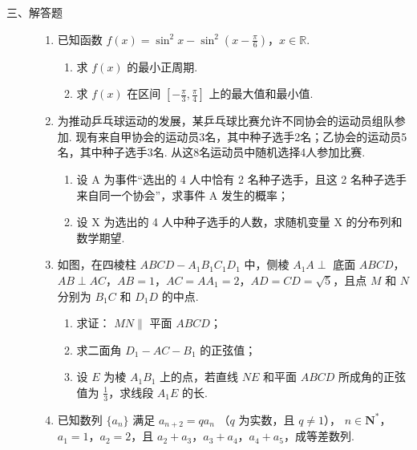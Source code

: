 \begin{description}

    \item[三、解答题]

    \begin{enumerate}[leftmargin=5pt]

      \addtocounter{enumi}{+14}

        \item 已知函数 \(f(x) = \sin^2 x - \sin^2 \left( x - \frac{\pi}{6} \right)\)，\(x \in \mathbb{R}\).

\begin{enumerate}
\item 求 \( f(x) \) 的最小正周期.
\item 求 \( f(x) \) 在区间 \( \left[-\frac{\pi}{3}, \frac{\pi}{4}\right] \) 上的最大值和最小值.
\end{enumerate}

        \item 为推动乒乓球运动的发展，某乒乓球比赛允许不同协会的运动员组队参加. 现有来自甲协会的运动员3名，其中种子选手2名；乙协会的运动员5名，其中种子选手3名. 从这8名运动员中随机选择4人参加比赛.

\begin{enumerate}
\item 设 A 为事件“选出的 4 人中恰有 2 名种子选手，且这 2 名种子选手来自同一个协会”，求事件 A 发生的概率；
\item 设 X 为选出的 4 人中种子选手的人数，求随机变量 X 的分布列和数学期望.
\end{enumerate}

        \item 如图，在四棱柱 \(ABCD - A_{1}B_{1}C_{1}D_{1}\) 中，侧棱 \(A_{1}A \perp\) 底面 \(ABCD\)，\(AB \perp AC\)，\(AB = 1\)，\(AC = AA_{1} = 2\)，\(AD = CD = \sqrt{5}\)，且点 \(M\) 和 \(N\) 分别为 \(B_{1}C\) 和 \(D_{1}D\) 的中点.

\begin{enumerate}
\item 求证： \(MN \parallel\) 平面 \(ABCD\)；
\item 求二面角 \(D_{1} - AC - B_{1}\) 的正弦值；
\item 设 \(E\) 为棱 \(A_{1}B_{1}\) 上的点，若直线 \(NE\) 和平面 \(ABCD\) 所成角的正弦值为 \(\frac{1}{3}\)，求线段 \(A_{1}E\) 的长.
\end{enumerate}

        \item 已知数列 \(\{a_{n}\}\) 满足 \(a_{n + 2} = qa_{n}\) （\(q\) 为实数，且 \(q \neq 1\)）， \(n \in \mathbf{N}^{*}\)，\(a_{1} = 1\)，\(a_{2} = 2\)，且 \(a_{2} + a_{3}\)，\(a_{3} + a_{4}\)，\(a_{4} + a_{5}\)，成等差数列.


\end{enumerate}
\end{description}
